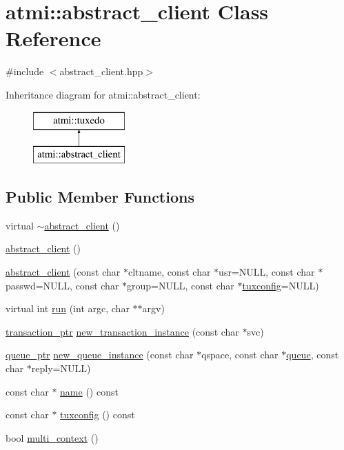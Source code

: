 \hypertarget{classatmi_1_1abstract__client}{\section{atmi\+:\+:abstract\+\_\+client Class Reference}
\label{classatmi_1_1abstract__client}
}


{\ttfamily \#include $<$abstract\+\_\+client.\+hpp$>$}

Inheritance diagram for atmi\+:\+:abstract\+\_\+client\+:\begin{figure}[H]
\begin{center}
\leavevmode
\includegraphics[height=2.000000cm]{classatmi_1_1abstract__client}
\end{center}
\end{figure}
\subsection*{Public Member Functions}
\begin{DoxyCompactItemize}
\item 
virtual \hyperlink{classatmi_1_1abstract__client_a789a662f195c11cd9d9b6d091caa0874}{$\sim$abstract\+\_\+client} ()
\item 
\hyperlink{classatmi_1_1abstract__client_a10a6aa2b44cb98ceab7d4e637757437e}{abstract\+\_\+client} ()
\item 
\hyperlink{classatmi_1_1abstract__client_a67d65b7ec70b83b7fc55260256ac4fd0}{abstract\+\_\+client} (const char $\ast$cltname, const char $\ast$usr=N\+U\+L\+L, const char $\ast$passwd=N\+U\+L\+L, const char $\ast$group=N\+U\+L\+L, const char $\ast$\hyperlink{classatmi_1_1abstract__client_af2a6efcd7a45c09251cb129d04d7aa85}{tuxconfig}=N\+U\+L\+L)
\item 
virtual int \hyperlink{classatmi_1_1abstract__client_a090bac30edb1055da2a0c980167bfe19}{run} (int argc, char $\ast$$\ast$argv)
\item 
\hyperlink{group__atmi_gab8e359f2305eaf285b0b0745d3b41997}{transaction\+\_\+ptr} \hyperlink{classatmi_1_1abstract__client_a9449f2df2136afd5b253389418265c87}{new\+\_\+transaction\+\_\+instance} (const char $\ast$svc)
\item 
\hyperlink{group__atmi_ga7cfd5961e0e05b148f12be311177a1a8}{queue\+\_\+ptr} \hyperlink{classatmi_1_1abstract__client_a7337c966369376497d9c1f94ec12c5ae}{new\+\_\+queue\+\_\+instance} (const char $\ast$qspace, const char $\ast$\hyperlink{classatmi_1_1queue}{queue}, const char $\ast$reply=N\+U\+L\+L)
\item 
const char $\ast$ \hyperlink{classatmi_1_1abstract__client_a2f50ed746c5bab5e01ef0677296e10e3}{name} () const 
\item 
const char $\ast$ \hyperlink{classatmi_1_1abstract__client_af2a6efcd7a45c09251cb129d04d7aa85}{tuxconfig} () const 
\item 
bool \hyperlink{classatmi_1_1abstract__client_a026c8cff81a66afdcfa3bf977417738a}{multi\+\_\+context} ()
\end{DoxyCompactItemize}
